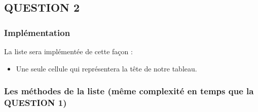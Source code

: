 \documentclass[11pt]{article}
\begin{document}
\subsection{QUESTION 2}
\label{sec:org216b1da}

\subsubsection{Implémentation}
\label{sec:org2a1e736}
La liste sera implémentée de cette façon :
\begin{itemize}
\item Une seule cellule qui représentera la tête de notre tableau.
\end{itemize}

\subsubsection{Les méthodes de la liste (même complexité en temps que la QUESTION 1)}
\label{sec:orgb5229be}
\end{document}
